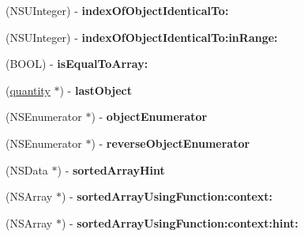 \begin{DoxyCompactItemize}
\item 
\hypertarget{interfaceget_quantities_response_a0d2ed37fed1ca190508afa64bc316c31}{}(N\+S\+U\+Integer) -\/ {\bfseries index\+Of\+Object\+Identical\+To\+:}\label{interfaceget_quantities_response_a0d2ed37fed1ca190508afa64bc316c31}

\item 
\hypertarget{interfaceget_quantities_response_a03c304b6f8c50524876a3daaa57d5c59}{}(N\+S\+U\+Integer) -\/ {\bfseries index\+Of\+Object\+Identical\+To\+:in\+Range\+:}\label{interfaceget_quantities_response_a03c304b6f8c50524876a3daaa57d5c59}

\item 
\hypertarget{interfaceget_quantities_response_af166c1dcec42ea8662a2ab42ed885562}{}(B\+O\+O\+L) -\/ {\bfseries is\+Equal\+To\+Array\+:}\label{interfaceget_quantities_response_af166c1dcec42ea8662a2ab42ed885562}

\item 
\hypertarget{interfaceget_quantities_response_a566d1cd5560d832ea42fcc864704a81c}{}(\hyperlink{interfacequantity}{quantity} $\ast$) -\/ {\bfseries last\+Object}\label{interfaceget_quantities_response_a566d1cd5560d832ea42fcc864704a81c}

\item 
\hypertarget{interfaceget_quantities_response_a37a07e1102a276cbd124d2132d63f691}{}(N\+S\+Enumerator $\ast$) -\/ {\bfseries object\+Enumerator}\label{interfaceget_quantities_response_a37a07e1102a276cbd124d2132d63f691}

\item 
\hypertarget{interfaceget_quantities_response_a76e570be96a3c9bc785cda25022e8007}{}(N\+S\+Enumerator $\ast$) -\/ {\bfseries reverse\+Object\+Enumerator}\label{interfaceget_quantities_response_a76e570be96a3c9bc785cda25022e8007}

\item 
\hypertarget{interfaceget_quantities_response_a1e39659c111e7898841ef6033b11a514}{}(N\+S\+Data $\ast$) -\/ {\bfseries sorted\+Array\+Hint}\label{interfaceget_quantities_response_a1e39659c111e7898841ef6033b11a514}

\item 
\hypertarget{interfaceget_quantities_response_af3b65eab55f334fba6b53dd560e9f2ad}{}(N\+S\+Array $\ast$) -\/ {\bfseries sorted\+Array\+Using\+Function\+:context\+:}\label{interfaceget_quantities_response_af3b65eab55f334fba6b53dd560e9f2ad}

\item 
\hypertarget{interfaceget_quantities_response_ab56fe5c10387362a590305db632455b9}{}(N\+S\+Array $\ast$) -\/ {\bfseries sorted\+Array\+Using\+Function\+:context\+:hint\+:}\label{interfaceget_quantities_response_ab56fe5c10387362a590305db632455b9}


\end{DoxyCompactItemize}
